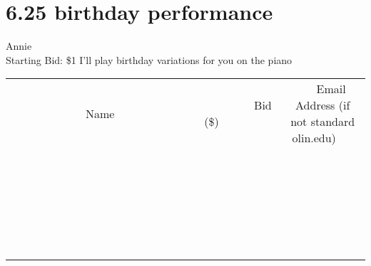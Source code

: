 \documentclass[11pt]{article}
\begin{document}
\section*{6.25 birthday performance}
Annie 
\\
Starting Bid: \$1
\newline
I'll play birthday variations for you on the piano
\\[6ex]
\begin{tabular}{c c c}
~~~~~~~~~~~~~Name~~~~~~~~~~~~~ & ~~~~~~~~~Bid (\$)~~~~~~~~~  & ~~~Email Address (if not standard olin.edu)~~~\\
 & & \\
\hline
 & & \\
\hline
 & & \\
\hline
 & & \\
\hline
 & & \\
\hline
 & & \\
\hline
 & & \\
\hline
 & & \\
\hline
 & & \\
\hline
 & & \\
\hline
 & & \\
\hline
 & & \\
\hline
 & & \\
\hline
 & & \\
\hline
 & & \\
\hline
 & & \\
\hline
 & & \\
\hline
 & & \\
\hline
 & & \\
\hline
 & & \\
\hline
 & & \\
\hline
 & & \\
\hline
 & & \\
\hline
 & & \\
\hline
 & & \\
\hline
 & & \\
\hline
\end{tabular}
\newpage
\end{document}

